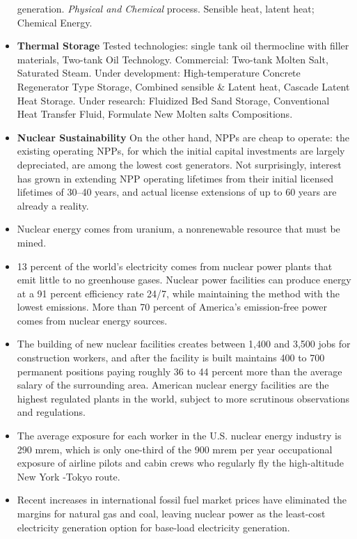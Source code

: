\documentclass[twocolumn]{article}
\begin{document}
\begin{itemize}
  generation. \emph{Physical and Chemical} process. Sensible heat,
  latent heat; Chemical Energy.
\item \textbf{Thermal Storage} Tested technologies: single tank oil
  thermocline with filler materials, Two-tank Oil
  Technology. Commercial:  Two-tank Molten Salt, Saturated Steam.
  Under development: High-temperature Concrete Regenerator Type
  Storage, Combined sensible \& Latent heat, Cascade Latent Heat
  Storage. Under research: Fluidized Bed Sand Storage, Conventional
  Heat Transfer Fluid, Formulate New Molten salts Compositions.
\item \textbf{Nuclear Sustainability} On the other hand, NPPs are cheap to operate: the existing
operating NPPs, for which the initial capital investments
are largely depreciated, are among the lowest cost
generators. Not surprisingly, interest has grown in
extending NPP operating lifetimes from their initial
licensed lifetimes of 30–40 years, and actual license
extensions of up to 60 years are already a reality. 
\item Nuclear energy comes from uranium, a nonrenewable resource that
  must be mined. 
\item 13 percent of the world’s electricity comes from nuclear power
  plants that emit little to no greenhouse gases. Nuclear power
  facilities can produce energy at a 91 percent efficiency rate 24/7,
  while maintaining the method with the lowest emissions. More than 70
  percent of America’s emission-free power comes from nuclear energy
  sources. 
\item The building of new nuclear facilities creates between 1,400 and
  3,500 jobs for construction workers, and after the facility is built
  maintains 400 to 700 permanent positions paying roughly 36 to 44
  percent more than the average salary of the surrounding
  area. American nuclear energy facilities are the highest regulated
  plants in the world, subject to more scrutinous observations and
  regulations. 
\item The average exposure for each worker in the U.S. nuclear energy industry is 290
mrem, which is only one-third of the 900 mrem per year occupational exposure of
airline pilots and cabin crews who regularly fly the high-altitude New York -Tokyo
route.
\item Recent increases in international fossil fuel market prices
have eliminated the margins for natural gas and coal,
leaving nuclear power as the least-cost electricity
generation option for base-load electricity generation.

\end{itemize}
\end{document}
